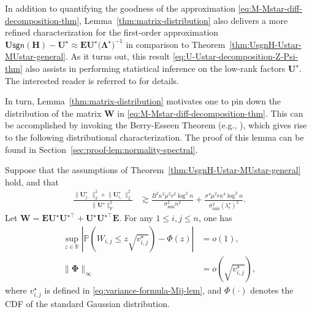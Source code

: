 %
\begin{remark}
	In addition to quantifying the goodness of the approximation \eqref{eq:M-Mstar-diff-decomposition-thm}, Lemma~\ref{thm:matrix-distribution} also delivers a more refined characterization for the first-order approximation $\bm{U}\mathsf{sgn}(\bm{H})-\bm{U}^{\star}\approx \bm{E}\bm{U}^{\star}\big(\bm{\Lambda}^{\star}\big)^{-1}$ in comparison to Theorem~\ref{thm:UsgnH-Ustar-MUstar-general}.  As it turns out, this result \eqref{eq:U-Ustar-decomposition-Z-Psi-thm} also assists in performing statistical inference on the low-rank factors $\bm{U}^{\star}$. The interested reader is referred  to \citet{yan2021inference} for details. 
\end{remark}


In turn, Lemma~\ref{thm:matrix-distribution} motivates one to pin down the distribution of the matrix $\bm{W}$ in \eqref{eq:M-Mstar-diff-decomposition-thm}. This can be accomplished by invoking the Berry-Esseen Theorem (e.g., \citet[Theorem 3.7]{chen2010normal}), which gives rise to the following distributional characterization. The proof of this lemma can be found in Section~\ref{sec:proof-lem:normality-spectral}. 
%
\begin{lemma}
	\label{lem:normality-spectral}
	Suppose that the assumptions of Theorem~\ref{thm:UsgnH-Ustar-MUstar-general} hold, and that 
%
\begin{align}
	\label{eq:Uj-Ui-lower-bound-lem-2}
	\frac{\big\|\bm{U}_{j,\cdot}^{\star}\big\|_{2}^{2}+\big\|\bm{U}_{i,\cdot}^{\star}\big\|_{2}^{2}}{\big\|\bm{U}^{\star}\big\|_{\mathrm{F}}^{2}}
	& \gtrsim \frac{B^{2}\kappa^2 \mu^{2}r^2\log ^2 n}{\sigma_{\min}^{2}n^{2}}
	+ \frac{\sigma^{4}\mu^{2}r\kappa^{4}\log^{3}n}{\sigma_{\min}^{2}(\lambda_{r}^{\star})^{2}} .
\end{align}
%
%
	Let $\bm{W}=\bm{E}\bm{U}^{\star}\bm{U}^{\star\top} + \bm{U}^{\star}\bm{U}^{\star\top}\bm{E}$. For any $1\leq i,j\leq n$, one has
	\begin{subequations}
	\begin{align}
		\sup_{z\in\mathbb{R}}\left|\mathbb{P}\left( W_{i,j}\leq z \sqrt{v_{i,j}^{\star}}\right) -\Phi(z)\right| &=o(1) , \label{eq:eqn-normality-spectral}\\
		\big\|\bm{\Phi}\big\|_{\infty} &= o\left( \sqrt{ v_{i,j}^{\star} } \right), 
		\label{eq:Phi-inf-norm-o-vij}
	\end{align}
	\end{subequations}
	where $v_{i,j}^{\star}$ is defined in \eqref{eq:variance-formula-Mij-lem}, and $\Phi(\cdot)$ denotes the CDF of the standard Gaussian distribution.  
\end{lemma}
%



